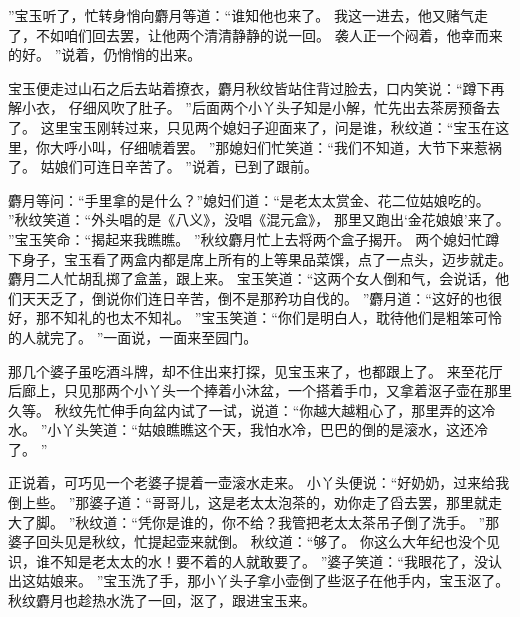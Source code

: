 ”宝玉听了，忙转身悄向麝月等道：“谁知他也来了。
我这一进去，他又赌气走了，不如咱们回去罢，让他两个清清静静的说一回。
袭人正一个闷着，他幸而来的好。
”说着，仍悄悄的出来。
\par
宝玉便走过山石之后去站着撩衣，麝月秋纹皆站住背过脸去，口内笑说：“蹲下再解小衣，
仔细风吹了肚子。
”后面两个小丫头子知是小解，忙先出去茶房预备去了。
这里宝玉刚转过来，只见两个媳妇子迎面来了，问是谁，秋纹道：“宝玉在这里，你大呼小叫，仔细唬着罢。
”那媳妇们忙笑道：“我们不知道，大节下来惹祸了。
姑娘们可连日辛苦了。
”说着，已到了跟前。
\par
麝月等问：“手里拿的是什么？”媳妇们道：“是老太太赏金、花二位姑娘吃的。
”秋纹笑道：“外头唱的是《八义》，没唱《混元盒》，
那里又跑出‘金花娘娘’来了。
”宝玉笑命：“揭起来我瞧瞧。
”秋纹麝月忙上去将两个盒子揭开。
两个媳妇忙蹲下身子，宝玉看了两盒内都是席上所有的上等果品菜馔，点了一点头，迈步就走。
麝月二人忙胡乱掷了盒盖，跟上来。
宝玉笑道：“这两个女人倒和气，会说话，他们天天乏了，倒说你们连日辛苦，倒不是那矜功自伐的。
”麝月道：“这好的也很好，那不知礼的也太不知礼。
”宝玉笑道：“你们是明白人，耽待他们是粗笨可怜的人就完了。
”一面说，一面来至园门。
\par
那几个婆子虽吃酒斗牌，却不住出来打探，见宝玉来了，也都跟上了。
来至花厅后廊上，只见那两个小丫头一个捧着小沐盆，一个搭着手巾，又拿着沤子壶在那里久等。
秋纹先忙伸手向盆内试了一试，说道：“你越大越粗心了，那里弄的这冷水。
”小丫头笑道：“姑娘瞧瞧这个天，我怕水冷，巴巴的倒的是滚水，这还冷了。
”\par
正说着，可巧见一个老婆子提着一壶滚水走来。
小丫头便说：“好奶奶，过来给我倒上些。
”那婆子道：“哥哥儿，这是老太太泡茶的，劝你走了舀去罢，那里就走大了脚。
”秋纹道：“凭你是谁的，你不给？我管把老太太茶吊子倒了洗手。
”那婆子回头见是秋纹，忙提起壶来就倒。
秋纹道：“够了。
你这么大年纪也没个见识，谁不知是老太太的水！要不着的人就敢要了。
”婆子笑道：“我眼花了，没认出这姑娘来。
”宝玉洗了手，那小丫头子拿小壶倒了些沤子在他手内，宝玉沤了。
秋纹麝月也趁热水洗了一回，沤了，跟进宝玉来。

